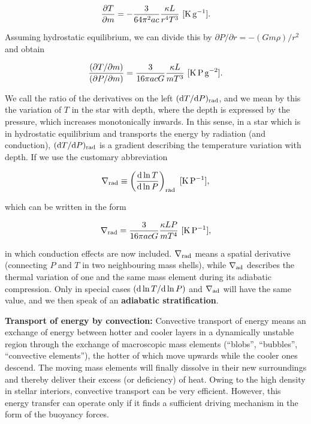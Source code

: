 \documentclass[a4paper,10pt]{article}
\begin{document}
\begin{align*}
    \frac{\partial T}{\partial m} = - \frac{3}{64\pi^2 ac} \frac{\kappa L}{r^4T^3} ~ [{\rm K\,g^{-1}}].
\end{align*}

{\noindent}Assuming hydrostatic equilibrium, we can divide this by $\partial P/\partial r = -(Gm\rho)/r^2$ and obtain

\begin{align*}
    \frac{(\partial T/\partial m)}{(\partial P/\partial m)} = \frac{3}{16\pi acG}\frac{\kappa L}{mT^3} ~ [{\rm K\,P\,g^{-2}}].
\end{align*}

{\noindent}We call the ratio of the derivatives on the left $({\rm d}T/{\rm d}P)_{\rm rad}$, and we mean by this the variation of $T$ in the star with depth, where the depth is expressed by the pressure, which increases monotonically inwards. In this sense, in a star which is in hydrostatic equilibrium and transports the energy by radiation (and conduction), $({\rm d}T/{\rm d}P)_{\rm rad}$ is a gradient describing the temperature variation with depth. If we use the customary abbreviation

\begin{align*}
    \nabla_{\rm rad} \equiv \left(\frac{{\rm d}\ln T}{{\rm d}\ln P}\right)_{\rm rad} ~ [{\rm K\,P^{-1}}],
\end{align*}

{\noindent}which can be written in the form

\begin{align*}
    \nabla_{\rm rad} = \frac{3}{16\pi acG}\frac{\kappa LP}{mT^4} ~ [{\rm K\,P^{-1}}],
\end{align*}

{\noindent}in which conduction effects are now included. $\nabla_{\rm rad}$ means a spatial derivative (connecting $P$ and $T$ in two neighbouring mass shells), while $\nabla_{\rm ad}$ describes the thermal variation of one and the same mass element during its adiabatic compression. Only in special cases $({\rm d}\ln T/{\rm d}\ln P)$ and $\nabla_{\rm ad}$ will have the same value, and we then speak of an \textbf{adiabatic stratification}.

{\noindent}\textbf{Transport of energy by convection:} Convective transport of energy means an exchange of energy between hotter and cooler layers in a dynamically unstable region through the exchange of macroscopic mass elements (``blobs'', ``bubbles'', ``convective elements''), the hotter of which move upwards while the cooler ones descend. The moving mass elements will finally dissolve in their new surroundings and thereby deliver their excess (or deficiency) of heat. Owing to the high density in stellar interiors, convective transport can be very efficient. However, this energy transfer can operate only if it finds a sufficient driving mechanism in the form of the buoyancy forces.
\end{document}
